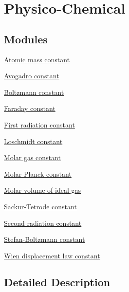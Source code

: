 \hypertarget{group___n_i_s_t_const-_physico_chemical}{}\section{Physico-\/\+Chemical}
\label{group___n_i_s_t_const-_physico_chemical}
\subsection*{Modules}
\begin{DoxyCompactItemize}
\item 
\hyperlink{group___n_i_s_t_const-_atomic_mass_constant}{Atomic mass constant}
\item 
\hyperlink{group___n_i_s_t_const-_avogadro_constant}{Avogadro constant}
\item 
\hyperlink{group___n_i_s_t_const-_boltzmann_constant}{Boltzmann constant}
\item 
\hyperlink{group___n_i_s_t_const-_faraday_constant}{Faraday constant}
\item 
\hyperlink{group___n_i_s_t_const-_first_radiation_constant}{First radiation constant}
\item 
\hyperlink{group___n_i_s_t_const-_loschmidt_constant}{Loschmidt constant}
\item 
\hyperlink{group___n_i_s_t_const-_molar_gas_constant}{Molar gas constant}
\item 
\hyperlink{group___n_i_s_t_const-_molar_planck_constant}{Molar Planck constant}
\item 
\hyperlink{group___n_i_s_t_const-_molar_volume}{Molar volume of ideal gas}
\item 
\hyperlink{group___n_i_s_t_const-_sackur_tetrode_constant}{Sackur-\/\+Tetrode constant}
\item 
\hyperlink{group___n_i_s_t_const-_second_radiation_constant}{Second radiation constant}
\item 
\hyperlink{group___n_i_s_t_const-_stefan_boltzmann_constant}{Stefan-\/\+Boltzmann constant}
\item 
\hyperlink{group___n_i_s_t_const-_wien_displacement}{Wien displacement law constant}
\end{DoxyCompactItemize}


\subsection{Detailed Description}
